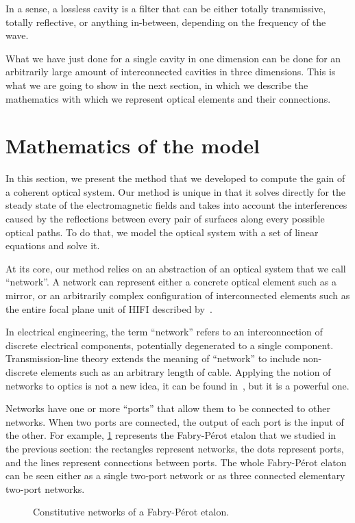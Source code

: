 In a sense, a lossless cavity is a filter that can be either totally transmissive, totally reflective, or anything in-between, depending on the frequency of the wave.

What we have just done for a single cavity in one dimension can be done for an arbitrarily large amount of interconnected cavities in three dimensions.
This is what we are going to show in the next section, in which we describe the mathematics with which we represent optical elements and their connections.



\FloatBarrier
\section{Mathematics of the model}
\label{sec:chapter2_3}

In this section, we present the method that we developed to compute the gain of a coherent optical system.
Our method is unique in that it solves directly for the steady state of the electromagnetic fields and takes into account the interferences caused by the reflections between every pair of surfaces along every possible optical paths.
To do that, we model the optical system with a set of linear equations and solve it.

At its core, our method relies on an abstraction of an optical system that we call ``network''.
A network can represent either a concrete optical element such as a mirror, or an arbitrarily complex configuration of interconnected elements such as the entire focal plane unit of HIFI described by~\textcite{jackson2002hifi}.

In electrical engineering, the term ``network'' refers to an interconnection of discrete electrical components, potentially degenerated to a single component.
Transmission-line theory extends the meaning of ``network'' to include non-discrete elements such as an arbitrary length of cable.
Applying the notion of networks to optics is not a new idea,
it can be found in~\textcite{siegman1986lasers},
but it is a powerful one.

Networks have one or more ``ports'' that allow them to be connected to other networks.
When two ports are connected, the output of each port is the input of the other.
For example, \cref{fig:fp_networks} represents the Fabry-Pérot etalon that we studied in the previous section: the rectangles represent networks, the dots represent ports, and the lines represent connections between ports.
The whole Fabry-Pérot elaton can be seen either as a single two-port network or as three connected elementary two-port networks.
\begin{figure}
    \centering
    
    \caption{Constitutive networks of a Fabry-Pérot etalon.}
    \label{fig:fp_networks}
\end{figure}

